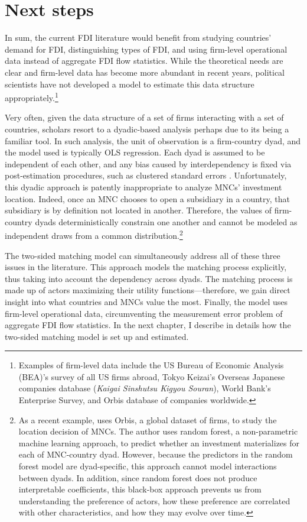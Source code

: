 \section{Next steps}

In sum, the current FDI literature would benefit from studying countries'
demand for FDI, distinguishing types of FDI, and using firm-level
operational data instead of aggregate FDI flow statistics. While the theoretical
needs are clear and firm-level data has become more abundant in recent years,
political scientists have not developed a model to estimate this data structure
appropriately.\footnote{Examples of firm-level data include the US Bureau of
  Economic Analysis (BEA)'s survey of all US firms abroad, Tokyo Keizai's
  Overseas Japanese companies database (\textit{Kaigai Sinshutsu Kigyou
    Souran}), World Bank's Enterprise Survey, and Orbis database of companies
  worldwide.}

Very often, given the data structure of a set of firms interacting with a set of
countries, scholars resort to a dyadic-based analysis perhaps due to its being a
familiar tool. In such analysis, the unit of observation is a firm-country dyad,
and the model used is typically OLS regression. Each dyad is assumed to be
independent of each other, and any bias caused by interdependency is fixed via
post-estimation procedures, such as clustered standard errors \citep{Dorff2013}.
Unfortunately, this dyadic approach is patently inappropriate to analyze MNCs'
investment location. Indeed, once an MNC chooses to open a subsidiary in a
country, that subsidiary is by definition not located in another. Therefore, the
values of firm-country dyads deterministically constrain one another and cannot
be modeled as independent draws from a common distribution.\footnote{As a recent
  example, \citet{Arel-Bundock2017} uses Orbis, a global dataset of firms, to
  study the location decision of MNCs. The author uses random forest, a
  non-parametric machine learning approach, to predict whether an investment
  materializes for each of MNC-country dyad. However, because the predictors in
  the random forest model are dyad-specific, this approach cannot model
  interactions between dyads. In addition, since random forest does not produce
  interpretable coefficients, this black-box approach prevents us from
  understanding the preference of actors, how these preference are correlated
  with other characteristics, and how they may evolve over time.}

The two-sided matching model can simultaneously address all of these three
issues in the literature. This approach models the matching process explicitly,
thus taking into account the dependency across dyads. The matching process is
made up of actors maximizing their utility functions---therefore, we gain direct
insight into what countries and MNCs value the most. Finally, the model uses
firm-level operational data, circumventing the measurement error problem of
aggregate FDI flow statistics. In the next chapter, I describe in details how
the two-sided matching model is set up and estimated.

